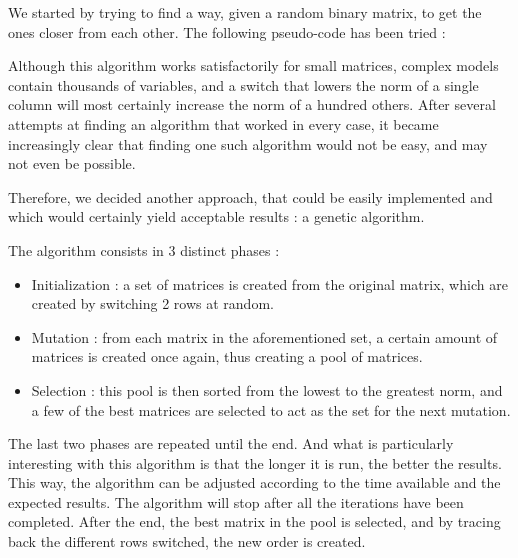 \documentclass[12pt]{report}
\begin{document}
We started by trying to find a way, given a random binary matrix, to get the ones closer from each other. The following pseudo-code has been tried :

\begin{algorithm}
\begin{algorithmic}[1]
    \EndIf
  \EndWhile
\EndFunction
\end{algorithmic}
\end{algorithm}

Although this algorithm works satisfactorily for small matrices, complex models contain thousands of variables, and a switch that lowers the norm of a single column will most certainly increase the norm of a hundred others.
After several attempts at finding an algorithm that worked in every case, it became increasingly clear that finding one such algorithm would not be easy, and may not even be possible.

Therefore, we decided another approach, that could be easily implemented and which would certainly yield acceptable results : a genetic algorithm. 

The algorithm consists in 3 distinct phases :

\begin{itemize}
  \item Initialization : a set of matrices is created from the original matrix, which are created by switching 2 rows at random.
  \item Mutation : from each matrix in the aforementioned set, a certain amount of matrices is created once again, thus creating a pool of matrices.
  \item Selection : this pool is then sorted from the lowest to the greatest norm, and a few of the best matrices are selected to act as the set for the next mutation.
\end{itemize}

The last two phases are repeated until the end. And what is particularly interesting with this algorithm is that the longer it is run, the better the results. This way, the algorithm can be adjusted according to the time available and the expected results. The algorithm will stop after all the iterations have been completed.
After the end, the best matrix in the pool is selected, and by tracing back the different rows switched, the new order is created.
\end{document}
